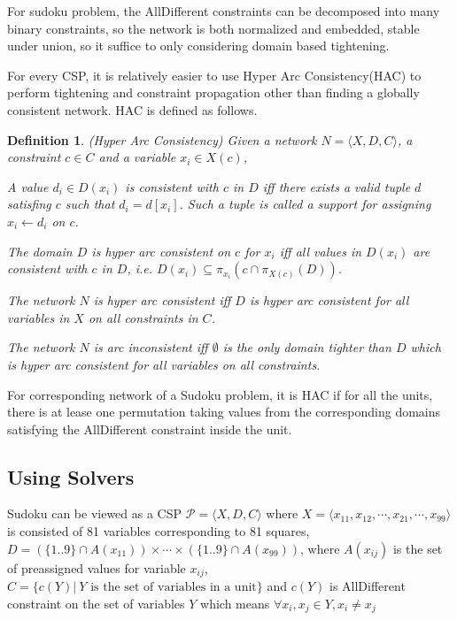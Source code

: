 \documentclass[a4paper, 12pt]{report}
\newtheorem{definition}{Definition}[subsection]
\begin{document}
            For sudoku problem, the AllDifferent constraints can be decomposed into many binary constraints, so the network is both normalized and embedded, stable under union, so it suffice to only considering domain based tightening.


            For every CSP, it is relatively easier to use Hyper Arc Consistency(HAC) to perform tightening and constraint propagation other than finding a globally consistent network. HAC is defined as follows.
            \begin{definition}
                (Hyper Arc Consistency) Given a network $N=\langle X,D,C\rangle$, a constraint $c\in C$ and a variable $x_i\in X(c)$,

                A value $d_i\in D(x_i)$ is consistent with $c$ in $D$ iff there exists a valid tuple $d$ satisfing $c$ such that $d_i=d[x_i]$. Such a tuple is called a support for assigning $x_i\leftarrow d_i$ on $c$.

                The domain $D$ is hyper arc consistent on $c$ for $x_i$ iff all values in $D(x_i)$ are consistent with $c$ in $D$, i.e. $D(x_i)\subseteq \pi_{x_i} (c\cap \pi_{X(c)} (D))$.

                The network $N$ is hyper arc consistent iff $D$ is hyper arc consistent for all variables in $X$ on all constraints in $C$.

                The network $N$ is arc inconsistent iff $\emptyset$ is the only domain tighter than $D$ which is hyper arc consistent for all variables on all constraints.
            \end{definition}

            For corresponding network of a Sudoku problem, it is HAC if for all the units, there is at lease one permutation taking values from the corresponding domains satisfying the AllDifferent constraint inside the unit.

        \subsection {Using Solvers}
            Sudoku can be viewed as a CSP $\mathcal P=\langle X, D, C\rangle$ where $X=\langle x_{11}, x_{12}, \cdots, x_{21}, \cdots, x_{99}\rangle$ is consisted of 81 variables corresponding to 81 squares, $D=(\{1..9\}\cap A(x_{11}))\times\cdots\times(\{1..9\}\cap A(x_{99}))$, where $A(x_{ij})$ is the set of preassigned values for variable $x_{ij}$,  $C=\{c(Y)|\ Y \text{ is the set of variables in a unit}\}$ and $c(Y)$ is AllDifferent constraint on the set of variables $Y$ which means $\forall x_i,x_j\in Y,
            x_i\neq x_j$
\end{document}
